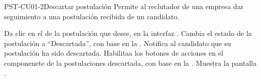 \clearpage
\begin{UseCase}[]{PST-CU01-2}{Descartar postulación}{
	Permite al reclutador de una empresa dar seguimiento a una postulación recibida de un candidato.
	}
\end{UseCase}

\begin{UCtrayectoria}
	\UCpaso [\UCactor] Da clic en el  de la postulación que desee, en la interfaz .
	\UCpaso [\UCsist] Cambia el estado de la postulación a ``Descartada'', con base en la .
	\UCpaso [\UCsist] Notifica al candidato que su postulación ha sido descartada.
	\UCpaso [\UCsist] Habilitaa los botones de acciones en el componenete  de la postulaciones descartada, con base en la .
	\UCpaso [\UCsist] Muestra la pantalla . \label{PST-CU01:1}

\end{UCtrayectoria}


